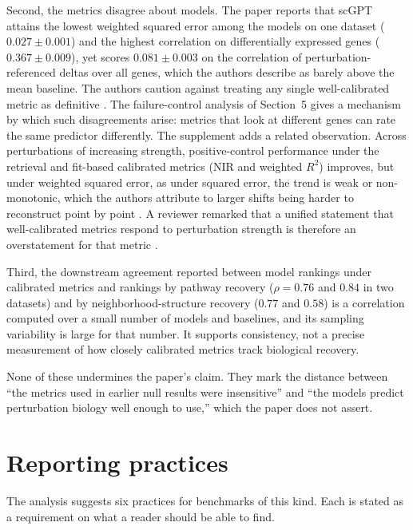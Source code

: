 \documentclass[11pt]{article}
\theoremstyle{definition}
\begin{document}
Second, the metrics disagree about models. The paper reports that scGPT attains the lowest weighted squared error among the models on one dataset ($0.027\pm0.001$) and the highest correlation on differentially expressed genes ($0.367\pm0.009$), yet scores $0.081\pm0.003$ on the correlation of perturbation-referenced deltas over all genes, which the authors describe as barely above the mean baseline. The authors caution against treating any single well-calibrated metric as definitive \citep{miller2026}. The failure-control analysis of Section~5 gives a mechanism by which such disagreements arise: metrics that look at different genes can rate the same predictor differently. The supplement adds a related observation. Across perturbations of increasing strength, positive-control performance under the retrieval and fit-based calibrated metrics (NIR and weighted $R^2$) improves, but under weighted squared error, as under squared error, the trend is weak or non-monotonic, which the authors attribute to larger shifts being harder to reconstruct point by point \citep{miller2026supp}. A reviewer remarked that a unified statement that well-calibrated metrics respond to perturbation strength is therefore an overstatement for that metric \citep{miller2026peer}.

Third, the downstream agreement reported between model rankings under calibrated metrics and rankings by pathway recovery ($\rho=0.76$ and $0.84$ in two datasets) and by neighborhood-structure recovery ($0.77$ and $0.58$) is a correlation computed over a small number of models and baselines, and its sampling variability is large for that number. It supports consistency, not a precise measurement of how closely calibrated metrics track biological recovery.

None of these undermines the paper's claim. They mark the distance between ``the metrics used in earlier null results were insensitive'' and ``the models predict perturbation biology well enough to use,'' which the paper does not assert.

\section{Reporting practices}

The analysis suggests six practices for benchmarks of this kind. Each is stated as a requirement on what a reader should be able to find.
\end{document}
